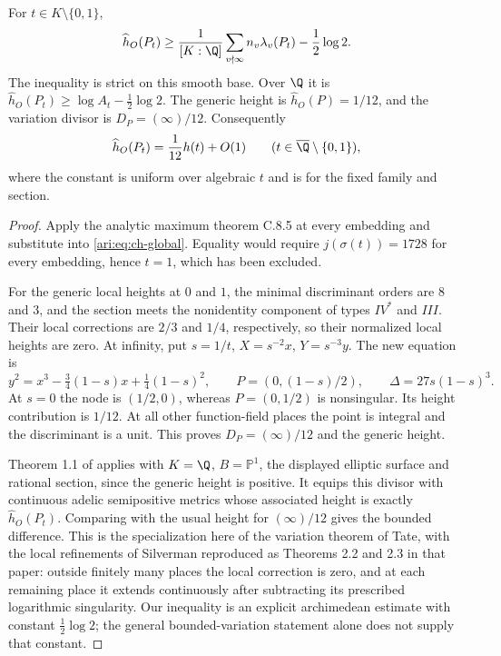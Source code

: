\begin{proposition}\label{ari:C.6.4}
For $t\in K\setminus\{0,1\}$,
\begin{equation}\label{ari:eq:ch-bound}
 \widehat h_O(P_t)\geq
 \frac1{[K:\Q]}\sum_{v\nmid\infty}n_v\lambda_v(P_t)
                    -\frac12\log2.
\end{equation}
The inequality is strict on this smooth base. Over $\Q$ it
is $\widehat h_O(P_t)\geq\log A_t-\frac12\log2$.
The generic height is $\widehat h_O(P)=1/12$, and the
variation divisor is $D_P=(\infty)/12$. Consequently
\[
 \widehat h_O(P_t)=\frac1{12}h(t)+O(1)
 \qquad(t\in\overline\Q\setminus\{0,1\}),
\]
where the constant is uniform over algebraic $t$ and is for
the fixed family and section.
\end{proposition}
\begin{proof}
Apply the analytic maximum theorem C.8.5 at every embedding
and substitute into \eqref{ari:eq:ch-global}. Equality would
require $j(\sigma(t))=1728$ for every embedding, hence $t=1$,
which has been excluded.

For the generic local heights at $0$ and $1$, the minimal
discriminant orders are $8$ and $3$, and the section meets
the nonidentity component of types $IV^*$ and $III$.
Their local corrections are $2/3$ and $1/4$, respectively,
so their normalized local heights are zero. At infinity,
put $s=1/t$, $X=s^{-2}x$, $Y=s^{-3}y$. The new equation is
\[
 y^2=x^3-\tfrac34(1-s)x+\tfrac14(1-s)^2,
 \qquad P=(0,(1-s)/2),\qquad\Delta=27s(1-s)^3.
\]
At $s=0$ the node is $(1/2,0)$, whereas $P=(0,1/2)$ is
nonsingular. Its height contribution is $1/12$.
At all other function-field places the point is integral
and the discriminant is a unit. This proves
$D_P=(\infty)/12$ and the generic height.

Theorem 1.1 of \citet{demarco2017} applies with $K=\Q$,
$B=\mathbb P^1$, the displayed elliptic surface and rational
section, since the generic height is positive. It equips
this divisor with continuous adelic semipositive metrics
whose associated height is exactly $\widehat h_O(P_t)$.
Comparing with the usual height for $(\infty)/12$ gives the
bounded difference. This is the specialization here of the
variation theorem of Tate, with the local refinements of
Silverman reproduced as Theorems 2.2 and 2.3 in that paper:
outside finitely many places the local correction is zero,
and at each remaining place it extends continuously after
subtracting its prescribed logarithmic singularity.
Our inequality is an explicit archimedean estimate with
constant $\frac12\log2$; the general bounded-variation
statement alone does not supply that constant.


\end{proof}
